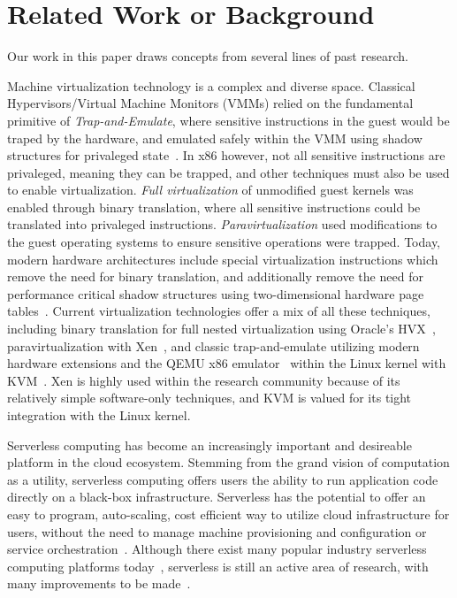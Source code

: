\section{Related Work or Background} \label{sec:related}
Our work in this paper draws concepts from several lines of past research.

 Machine virtualization technology is
a complex and diverse space. Classical Hypervisors/Virtual Machine Monitors
(VMMs) relied on the fundamental primitive of \emph{Trap-and-Emulate}, where
sensitive instructions in the guest would be traped by the hardware, and
emulated safely within the VMM using shadow structures for privaleged
state~\cite{classic-virt}. In x86 however, not all sensitive instructions are
privaleged, meaning they can be trapped, and other techniques must also be used
to enable virtualization. \emph{Full virtualization} of unmodified guest
kernels was enabled through binary translation, where all sensitive
instructions could be translated into privaleged instructions.
\emph{Paravirtualization} used modifications to the guest operating systems to
ensure sensitive operations were trapped. Today, modern hardware architectures
include special virtualization instructions which remove the need for binary
translation, and additionally remove the need for performance critical shadow
structures using two-dimensional hardware page tables~\cite{virt-techniques}.
Current virtualization technologies offer a mix of all these techniques,
including binary translation for full nested virtualization using Oracle's
HVX~\cite{hvx}, paravirtualization with Xen~\cite{xen}, and classic
trap-and-emulate utilizing modern hardware extensions and the QEMU x86
emulator~\cite{qemu} within the Linux kernel with KVM~\cite{kvm}. Xen is highly
used within the research community because of its relatively simple
software-only techniques, and KVM is valued for its tight integration with the
Linux kernel.

 Serverless computing has become an
increasingly important and desireable platform in the cloud ecosystem. Stemming
from the grand vision of computation as a utility, serverless computing offers
users the ability to run application code directly on a black-box
infrastructure. Serverless has the potential to offer an easy to program,
auto-scaling, cost efficient way to utilize cloud infrastructure for users,
without the need to manage machine provisioning and configuration or service
orchestration~\cite{berkeley-serverless}. Although there exist many popular
industry serverless computing platforms
today~\cite{lambda}\cite{gcf}\cite{azure-cf}\cite{openwhisk}, serverless is
still an active area of research, with many improvements to be
made~\cite{peeking}\cite{trilemma}\cite{steps-back}.

